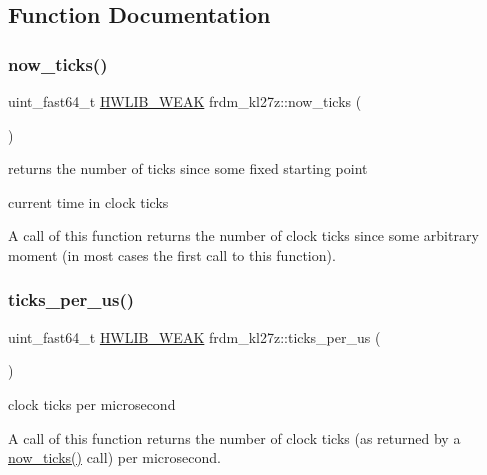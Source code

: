 \subsection{Function Documentation}
\mbox{\label{hwlib-frdm-kl27z_8hpp_file_a892420fb0c3e0a9ceaa1536d2584b196}} 
\subsubsection{\texorpdfstring{now\+\_\+ticks()}{now\_ticks()}}
{\footnotesize\ttfamily uint\+\_\+fast64\+\_\+t \hyperlink{hwlib-defines_8hpp_a04be4340016df60d6636c1d1c6d94fc9}{H\+W\+L\+I\+B\+\_\+\+W\+E\+AK} frdm\+\_\+kl27z\+::now\+\_\+ticks (\begin{DoxyParamCaption}{ }\end{DoxyParamCaption})}



returns the number of ticks since some fixed starting point 

current time in clock ticks

A call of this function returns the number of clock ticks since some arbitrary moment (in most cases the first call to this function). \mbox{\label{hwlib-frdm-kl27z_8hpp_file_a3a22a56400f28b8eb02535cb389b740a}} 
\subsubsection{\texorpdfstring{ticks\+\_\+per\+\_\+us()}{ticks\_per\_us()}}
{\footnotesize\ttfamily uint\+\_\+fast64\+\_\+t \hyperlink{hwlib-defines_8hpp_a04be4340016df60d6636c1d1c6d94fc9}{H\+W\+L\+I\+B\+\_\+\+W\+E\+AK} frdm\+\_\+kl27z\+::ticks\+\_\+per\+\_\+us (\begin{DoxyParamCaption}{ }\end{DoxyParamCaption})}

clock ticks per microsecond

A call of this function returns the number of clock ticks (as returned by a \hyperlink{namespacehwlib_a004512830e68d72d8fd0e3153895e65b}{now\+\_\+ticks()} call) per microsecond. 